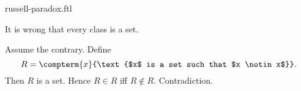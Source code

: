 \documentclass{article}
\begin{document}
\begin{smodule}{russell-paradox.ftl}
  \begin{ftheorem*}[label=russell_paradox,title=Russell's Paradox]
    It is wrong that every class is a set.
  \end{ftheorem*}
  \begin{fproof}
    Assume the contrary.
    Define \[R = \compterm{x}{\text{$x$ is a set such that $x \notin x$}}.\]
    Then $R$ is a set.
    Hence $R \in R$ iff $R \notin R$.
    Contradiction.
  \end{fproof}
\end{smodule}
\end{document}
